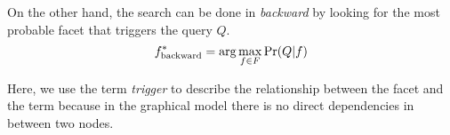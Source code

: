 On the other hand, the search can be done in \emph{backward} by looking for the most probable facet that triggers the query $Q$.
\begin{equation}f^*_{\rm backward} = \arg\max_{f \in F} \Pr(Q|f) \end{equation}

Here, we use the term \emph{trigger} to describe the relationship between the
facet and the term because in the graphical model there is no direct
dependencies in between two nodes.

% 
% 
% 
% 
% 
% 

